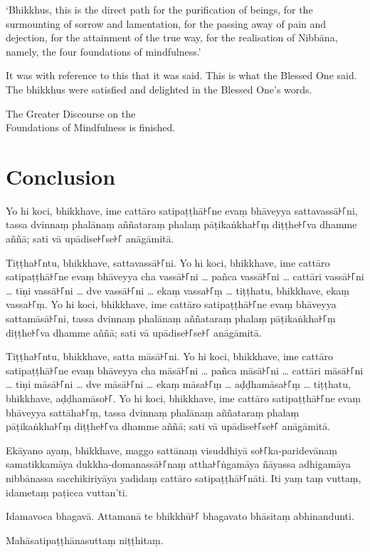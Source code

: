 `Bhikkhus, this is the direct path for the purification of beings, for the
surmounting of sorrow and lamentation, for the passing away of pain and
dejection, for the attainment of the true way, for the realisation of Nibbāna,
namely, the four foundations of mindfulness.'

It was with reference to this that it was said. This is what the Blessed One
said. The bhikkhus were satisfied and delighted in the Blessed One's words.

\bigskip

{\centering\instructionFont\color{instruction}\upshape

  The Greater Discourse on the\\
  Foundations of Mindfulness is finished.

}

\paliPage
\chapter*{Conclusion}

Yo hi koci, bhikkhave, ime cattāro satipaṭṭhā꜔꜒ne evaṃ bhāveyya sattavassā꜔꜒ni,
tassa dvinnaṃ phalānaṃ aññataraṃ phalaṃ pāṭikaṅkha꜔꜒ṃ diṭṭhe꜔꜒va dhamme aññā; sati
vā upādise꜔꜒se꜔꜒ anāgāmitā.

Tiṭṭha꜔꜒ntu, bhikkhave, sattavassā꜔꜒ni. Yo hi koci, bhikkhave, ime cattāro
satipaṭṭhā꜔꜒ne evaṃ bhāveyya cha vassā꜔꜒ni \ldots{} pañca vassā꜔꜒ni
\ldots{} cattāri vassā꜔꜒ni \ldots{} tīṇi vassā꜔꜒ni \ldots{} dve vassā꜔꜒ni \ldots{}
ekaṃ vassa꜔꜒ṃ \ldots{} tiṭṭhatu, bhikkhave, ekaṃ vassa꜔꜒ṃ. Yo hi koci, bhikkhave,
ime cattāro satipaṭṭhā꜔꜒ne evaṃ bhāveyya sattamāsā꜔꜒ni, tassa dvinnaṃ phalānaṃ
aññataraṃ phalaṃ pāṭikaṅkha꜔꜒ṃ diṭṭhe꜔꜒va dhamme aññā; sati vā upādise꜔꜒se꜔꜒ anāgāmitā.

Tiṭṭha꜔꜒ntu, bhikkhave, satta māsā꜔꜒ni. Yo hi koci, bhikkhave, ime cattāro
satipaṭṭhā꜔꜒ne evaṃ bhāveyya cha māsā꜔꜒ni \ldots{} pañca māsā꜔꜒ni \ldots{}
cattāri māsā꜔꜒ni \ldots{} tīṇi māsā꜔꜒ni \ldots{} dve māsā꜔꜒ni \ldots{} ekaṃ māsa꜔꜒ṃ
\ldots{} aḍḍhamāsa꜔꜒ṃ \ldots{} tiṭṭhatu, bhikkhave, aḍḍhamāso꜔꜒. Yo hi koci,
bhikkhave, ime cattāro satipaṭṭhā꜔꜒ne evaṃ bhāveyya sattāha꜔꜒ṃ, tassa dvinnaṃ
phalānaṃ aññataraṃ phalaṃ pāṭikaṅkha꜔꜒ṃ diṭṭhe꜔꜒va dhamme aññā; sati vā upādise꜔꜒se꜔꜒
anāgāmitā.

Ekāyano ayaṃ, bhikkhave, maggo sattānaṃ visuddhiyā so꜔꜒ka-paridevānaṃ samatikkamāya
dukkha-domanassā꜔꜒naṃ attha꜔꜒ṅgamāya ñāyassa adhigamāya nibbānassa sacchikiriyāya
yadidaṃ cattāro satipaṭṭhā꜔꜒nāti. Iti yaṃ taṃ vuttaṃ, idametaṃ paṭicca vuttan'ti.

Idamavoca bhagavā. Attamanā te bhikkhū꜔꜒ bhagavato bhāsitaṃ abhinandunti.

\bigskip

{\centering\instructionFont\color{instruction}\upshape

  Mahāsatipaṭṭhānasuttaṃ niṭṭhitaṃ.

}

\resumeNormalText
